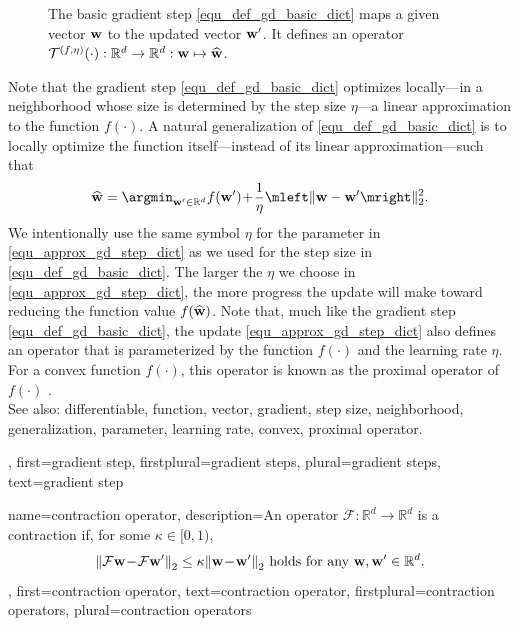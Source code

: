 {{{\begin{figure}[H]
\begin{center}
			\end{center}
			\caption{The basic gradient step \eqref{equ_def_gd_basic_dict} maps a given vector ${\bf w}$ 
			to the updated vector ${\bf w}'$. It defines an operator 
			$\mathcal{T}^{(f,\eta)}(\cdot): \mathbb{R}^{d} \rightarrow \mathbb{R}^{d}:
			 {\bf w} \mapsto \widehat{{\bf w}}$.}
			\label{fig_basic_GD_step_single_dict}
		\end{figure}
		Note that the gradient step \eqref{equ_def_gd_basic_dict} optimizes locally—in a neighborhood whose size is 
		determined by the step size $\eta$—a linear approximation 
		to the function $f(\cdot)$. A natural generalization of \eqref{equ_def_gd_basic_dict} is to locally 
		optimize the function itself—instead of its linear approximation—such that
		\begin{align} 
		\label{equ_approx_gd_step_dict}
		\widehat{{\bf w}} = \argmin_{{\bf w}' \in \mathbb{R}^{d}} f({\bf w}')\!+\!\frac{1}{\eta}\mleft\lVert {\bf w}-{\bf w}' \mright\rVert_{2}^2. 
		\end{align}
		We intentionally use the same symbol $\eta$ for the parameter in \eqref{equ_approx_gd_step_dict} 
		as we used for the step size in \eqref{equ_def_gd_basic_dict}. The larger the $\eta$ we choose in 
		\eqref{equ_approx_gd_step_dict}, the more progress the update will make toward reducing the 
		function value $f(\widehat{{\bf w}})$. Note that, much like the gradient step \eqref{equ_def_gd_basic_dict}, 
		the update \eqref{equ_approx_gd_step_dict} also defines an operator 
		that is parameterized by the function $f(\cdot)$ and the learning rate $\eta$. For a convex function  
		$f(\cdot)$, this operator is known as the proximal operator of $f(\cdot)$ \cite{ProximalMethods}. 
					\\ 
		See also: differentiable, function, vector, gradient, step size, neighborhood, generalization, parameter, learning rate, convex, proximal operator.},
	first={gradient step},
	firstplural={gradient steps},
	plural={gradient steps},
	text={gradient step}
}

{name={contraction operator},
	description={An operator $\mathcal{F}: \mathbb{R}^{d} \rightarrow \mathbb{R}^{d}$
		is a contraction if, for some $\kappa \in [0,1)$,
		\begin{equation} 
			\nonumber
			\mleft\lVert  \mathcal{F} {\bf w}\!-\!\mathcal{F} {\bf w}' \mright\rVert_{2}  \leq  \kappa	\mleft\lVert {\bf w}\!-\!{\bf w}' \mright\rVert_{2} \mbox{ holds for any } {\bf w},{\bf w}' \in \mathbb{R}^{d}.
		\end{equation}
	},
	first={contraction operator},
	text={contraction operator}, 
	firstplural={contraction operators}, 
	plural={contraction operators}
}
	

}
